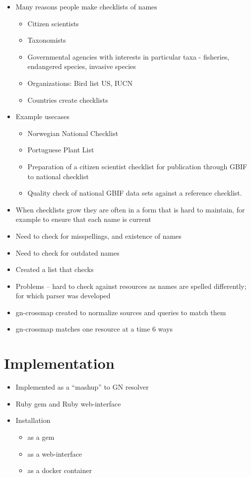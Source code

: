 \documentclass{bmcart}
\begin{document}
\begin{itemize}
  \item Many reasons people make checklists of names
    \begin{itemize}
      \item Citizen scientists
      \item Taxonomists
      \item Governmental agencies with interests in particular taxa - fisheries, endangered species, invasive species
      \item Organizations: Bird list US, IUCN
      \item Countries create checklists
    \end{itemize}
  \item Example usecases 
    \begin{itemize}
      \item Norwegian National Checklist
      \item Portuguese Plant List
      \item Preparation of a citizen scientist checklist for publication
        through GBIF to national checklist
      \item Quality check of national GBIF data sets against a reference
        checklist.
    \end{itemize}
  \item When checklists grow they are often in a form that is hard to maintain, for example to ensure that each name is current
  \item Need to check for misspellings, and existence of names
  \item Need to check for outdated names
  \item Created a list that checks
  \item Problems -- hard to check against resources as names are spelled
    differently; for which parser was developed
  \item gn-crossmap created to normalize sources and queries to match them
  \item gn-crossmap matches one resource at a time 6 ways
\end{itemize}

\section*{Implementation}
\begin{itemize}
  \item Implemented as a ``mashup'' to GN resolver
  \item Ruby gem and Ruby web-interface
  \item Installation
    \begin{itemize}
      \item as a gem
      \item as a web-interface
      \item as a docker container
    \end{itemize}
\end{itemize}
\end{document}
